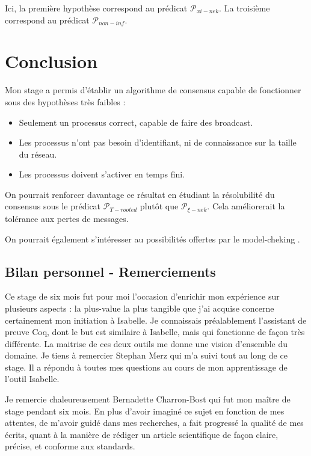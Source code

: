 \documentclass{article}
\begin{document}
Ici, la première hypothèse correspond au prédicat $\mathcal{P}_{xi-nek}$. La troisième correspond au prédicat $\mathcal{P}_{non-inf}$.

\section{Conclusion}

Mon stage a permis d'établir un algorithme de consensus capable de fonctionner sous des hypothèses très faibles :
\begin{itemize}
	\item Seulement un processus correct, capable de faire des broadcast.
	\item Les processus n'ont pas besoin d'identifiant, ni de connaissance sur la taille du réseau.
	\item Les processus doivent s'activer en temps fini.
\end{itemize}

On pourrait renforcer davantage ce résultat en étudiant la résolubilité du consensus sous le prédicat $\mathcal{P}_{T-rooted}$ plutôt que $\mathcal{P}_{\xi-nek}$.
Cela améliorerait la tolérance aux pertes de messages.

On pourrait également s'intéresser au possibilités offertes par le model-cheking \cite{model_checking}.

\subsection{Bilan personnel - Remerciements}

Ce stage de six mois fut pour moi l'occasion d'enrichir mon expérience sur plusieurs aspects :
la plus-value la plus tangible que j'ai acquise concerne certainement mon initiation à Isabelle. Je connaissais préalablement l'assistant de preuve Coq, dont le but est similaire à Isabelle,
mais qui fonctionne de façon très différente. La maitrise de ces deux outils me donne une vision d'ensemble du domaine.
Je tiens à remercier Stephan Merz qui m'a suivi tout au long de ce stage. Il a répondu à toutes mes questions au cours de mon apprentissage de l'outil Isabelle.

Je remercie chaleureusement Bernadette Charron-Bost qui fut mon maître de stage pendant six mois.
En plus d’avoir imaginé ce sujet en fonction de mes attentes, de m’avoir guidé dans mes recherches, a fait progressé la qualité de mes
écrits, quant à la manière de rédiger un article scientifique de façon claire, précise, et conforme aux standards.
\end{document}

